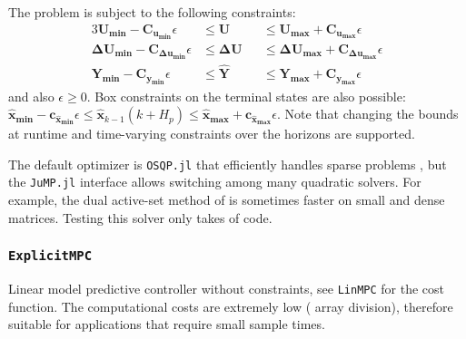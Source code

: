 The problem is subject to the following constraints:
\begin{alignat}{3}
    \mathbf{U_{min}  - C_{u_{min}}}  \epsilon &\le \mathbf{U}  &&\le \mathbf{U_{max}  + C_{u_{max}}}  \epsilon \\
    \mathbf{ΔU_{min} - C_{Δu_{min}}} \epsilon &\le \mathbf{ΔU} &&\le \mathbf{ΔU_{max} + C_{Δu_{max}}} \epsilon \\
    \mathbf{Y_{min}  - C_{y_{min}}}  \epsilon &\le \mathbf{\hat{Y}} &&\le \mathbf{Y_{max}  + C_{y_{max}}}  \epsilon
\end{alignat}
and also $\epsilon \ge 0$.  Box constraints on the terminal states are also possible: $\mathbf{\hat{x}_{min}} {-} \mathbf{c_{\hat{x}_{min}}}\epsilon \le \mathbf{\hat{x}}_{k-1}(k{+}H_p) \le \mathbf{\hat{x}_{max}} + \mathbf{c_{\hat{x}_{max}}}\epsilon$. Note that changing the bounds at runtime and time-varying constraints over the horizons are supported.

The default optimizer is \texttt{OSQP.jl} that efficiently handles sparse problems \citep{osqp}, but the \texttt{JuMP.jl} interface allows switching among many quadratic solvers. For example, the dual active-set method of \citet{daqp} is sometimes faster on small and dense matrices. Testing this solver only takes  of code.

\subsubsection{\textnormal{\texttt{ExplicitMPC}}}
Linear model predictive controller without constraints, see \texttt{LinMPC} for the cost function. The computational costs are extremely low ( array division), therefore suitable for applications that require small sample times. 

